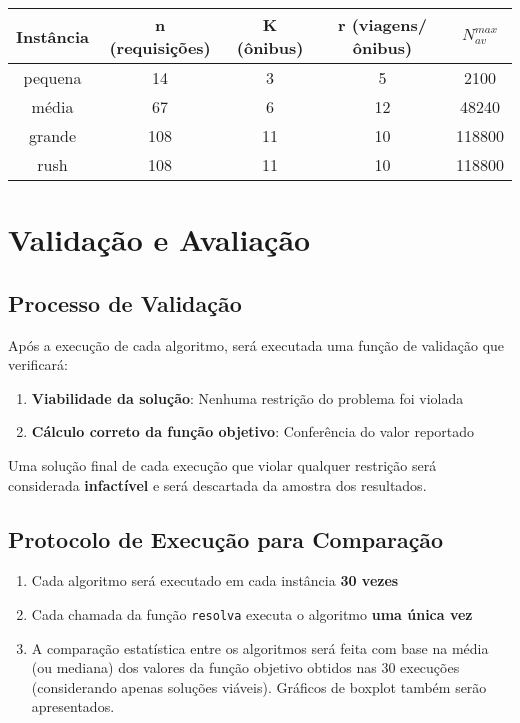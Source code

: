 \documentclass[12pt,a4paper]{article}
\begin{document}
\begin{tcolorbox}[colback=green!5!white,colframe=green!75!black,title=Número Máximo de Avaliações por Instância]
\begin{tabular}{|c|c|c|c|c|}
\hline
\textbf{Instância} & \textbf{n (requisições)} & \textbf{K (ônibus)} & \textbf{r (viagens/ônibus)} & \textbf{$N^{max}_{av}$} \\
\hline
pequena & 14 & 3 & 5 & 2100 \\
\hline
média & 67 & 6 & 12 & 48240 \\
\hline
grande & 108 & 11 & 10 & 118800 \\
\hline
rush & 108 & 11 & 10 & 118800 \\
\hline
\end{tabular}
\end{tcolorbox}

\section{Validação e Avaliação}

\subsection{Processo de Validação}

Após a execução de cada algoritmo, será executada uma função de validação que verificará:

\begin{enumerate}
    \item \textbf{Viabilidade da solução}: Nenhuma restrição do problema foi violada
    \item \textbf{Cálculo correto da função objetivo}: Conferência do valor reportado
\end{enumerate}

\begin{tcolorbox}[colback=red!5!white,colframe=red!75!black,title=\textbf{Atenção}]
Uma solução final de cada execução que violar qualquer restrição será considerada \textbf{infactível} e será descartada da amostra dos resultados.
\end{tcolorbox}

\subsection{Protocolo de Execução para Comparação}

\begin{enumerate}
    \item Cada algoritmo será executado em cada instância \textbf{30 vezes}
    \item Cada chamada da função \texttt{resolva} executa o algoritmo \textbf{uma única vez}
    \item A comparação estatística entre os algoritmos será feita com base na média (ou mediana) dos valores da função objetivo obtidos nas 30 execuções (considerando apenas soluções viáveis). Gráficos de boxplot também serão apresentados.
\end{enumerate}
\end{document}
